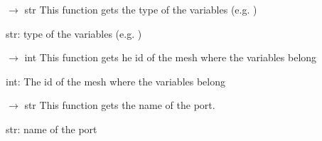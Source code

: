 \documentclass[letterpaper,10pt,english]{sphinxmanual}
\begin{document}
\begin{fulllineitems}
\begin{fulllineitems}
\begin{description}
\end{description}

\end{fulllineitems}


\begin{fulllineitems}
\label{\detokenize{scrimp:scrimp.port.Port.get_kind}}
\pysigstartsignatures
\pysiglinewithargsret
{}
{}
{{ $\rightarrow$ str}}
\pysigstopsignatures
\sphinxAtStartPar
This function gets the type of the variables (e.g. )
\begin{description}
\sphinxAtStartPar
str: type of the variables (e.g. )

\end{description}

\end{fulllineitems}


\begin{fulllineitems}
\label{\detokenize{scrimp:scrimp.port.Port.get_mesh_id}}
\pysigstartsignatures
\pysiglinewithargsret
{}
{}
{{ $\rightarrow$ int}}
\pysigstopsignatures
\sphinxAtStartPar
This function gets he id of the mesh where the variables belong
\begin{description}
\sphinxAtStartPar
int: The id of the mesh where the variables belong

\end{description}

\end{fulllineitems}


\begin{fulllineitems}
\label{\detokenize{scrimp:scrimp.port.Port.get_name}}
\pysigstartsignatures
\pysiglinewithargsret
{}
{}
{{ $\rightarrow$ str}}
\pysigstopsignatures
\sphinxAtStartPar
This function gets the name of the port.
\begin{description}
\sphinxAtStartPar
str: name of the port


\end{description}
\end{fulllineitems}
\end{fulllineitems}
\end{document}
